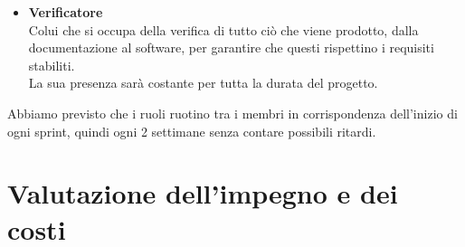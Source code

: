 \documentclass[a4paper,12pt]{article}
\begin{document}
{\begin{itemize}
            \newpage
            \item \textbf{Verificatore}\\
                Colui che si occupa della verifica di tutto ciò che viene prodotto, dalla documentazione al software, per garantire che questi rispettino i requisiti stabiliti.\\
                La sua presenza sarà costante per tutta la durata del progetto.
        \end{itemize}
        Abbiamo previsto che i ruoli ruotino tra i membri in corrispondenza dell'inizio di ogni sprint, quindi ogni 2 settimane senza contare possibili ritardi.
    }

    \section{Valutazione dell'impegno e dei costi} {
}
\end{document}
